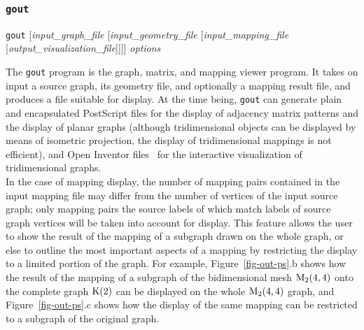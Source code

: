\subsubsection{\texttt{gout}}
\label{sec-prog-gout}

\begin{itemize}
\progsyn
\texttt{gout} [{\it input\_graph\_file} [{\it input\_geometry\_file} [{\it input\_\lbt mapping\_\lbt file} [{\it output\_\lbt visualization\_\lbt file}]]]] {\it options}

\progdes
The \texttt{gout} program is the graph, matrix, and mapping viewer program. It
takes on input a source graph, its geometry file, and optionally a mapping
result file, and produces a file suitable for display.
At the time being, \texttt{gout} can generate plain and encapsulated PostScript
files for the display of adjacency matrix patterns and the
display of planar graphs (although tridimensional objects
can be displayed by means of isometric projection, the display of
tridimensional mappings is not efficient), and {\sc Open Inventor}
files~\cite{oinv} for the interactive visualization of
tridimensional graphs.
\\
In the case of mapping display,
the number of mapping pairs contained in the input mapping file may
differ from the number of vertices of the input source graph;
only mapping pairs the source labels of which match labels of source graph
vertices will be taken into account for display.
This feature allows the user to show the result of the mapping of a subgraph
drawn on the whole graph, or else to outline the most important aspects
of a mapping by restricting the display to a limited portion of the graph.
For example, Figure~\ref{fig-out-ps}\@.b shows how the result of the mapping of
a subgraph of the bidimensional mesh ${\rm M}_{2}(4,4)$ onto the complete graph
${\rm K}(2)$ can be displayed on the whole ${\rm M}_{2}(4,4)$ graph,
and Figure~\ref{fig-out-ps}\@.c shows how the display of the same mapping
can be restricted to a subgraph of the original graph.
\begin{figure}[hbt]
\hfill
\parbox[t]{4.5cm}{
\hfill
}
\end{figure}
\end{itemize}
